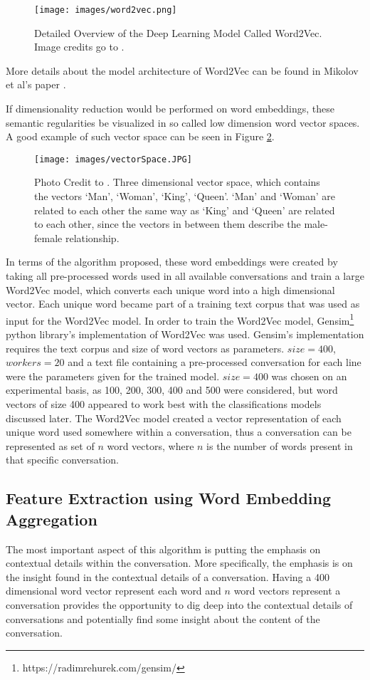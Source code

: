 \documentclass[11pt]{article}
\begin{document}
\begin{figure}[h!]
    \centering
    \texttt{[image: images/word2vec.png]}
    \caption{Detailed Overview of the Deep Learning Model Called Word2Vec. Image credits go to \cite{Kevin2015}.}
    \label{fig:word2vec}
\end{figure}

More details about the model architecture of Word2Vec can be found in Mikolov et al's paper \cite{mikolov2013efficient}.

If dimensionality reduction would be performed on word embeddings, these semantic regularities be visualized in so called low dimension word vector spaces. A good example of such vector space can be seen in Figure \ref{fig:vectorSpace}.

\begin{figure}[h!]
    \centering
    \texttt{[image: images/vectorSpace.JPG]}
    \caption{Photo Credit to \cite{Vidhya}. Three dimensional vector space, which contains the vectors `Man', `Woman', `King', `Queen'. `Man' and `Woman' are related to each other the same way as `King' and `Queen' are related to each other, since the vectors in between them describe the male-female relationship.}
    \label{fig:vectorSpace}
\end{figure}

In terms of the algorithm proposed, these word embeddings were created by taking all pre-processed words used in all available conversations and train a large Word2Vec model, which converts each unique word into a high dimensional vector. Each unique word became part of a training text corpus that was used as input for the Word2Vec model. In order to train the Word2Vec model, Gensim\footnote{https://radimrehurek.com/gensim/} \cite{rehurek_lrec} python library's implementation of Word2Vec was used. Gensim's implementation requires the text corpus and size of word vectors as parameters. $size = 400$, $workers=20$ and a text file containing a pre-processed conversation for each line were the parameters given for the trained model. $size = 400$ was chosen on an experimental basis, as 100, 200, 300, 400 and 500 were considered, but word vectors of size 400 appeared to work best with the classifications models discussed later. The Word2Vec model created a vector representation of each unique word used somewhere within a conversation, thus a conversation can be represented as set of $n$ word vectors, where $n$ is the number of words present in that specific conversation. 

\subsection{Feature Extraction using Word Embedding Aggregation}
The most important aspect of this algorithm is putting the emphasis on contextual details within the conversation. More specifically, the emphasis is on the insight found in the contextual details of a conversation. Having a 400 dimensional word vector represent each word and $n$ word vectors represent a conversation provides the opportunity to dig deep into the contextual details of conversations and potentially find some insight about the content of the conversation. 
\end{document}
